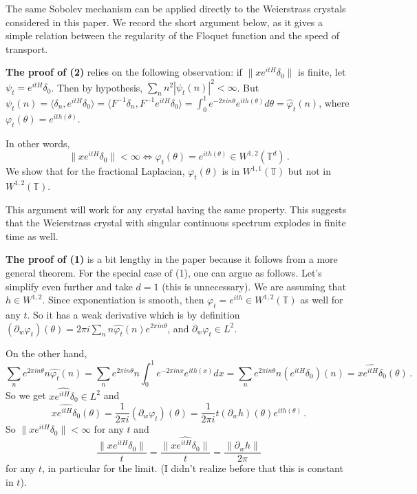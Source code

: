 \documentclass[11pt]{amsart}
\theoremstyle{plain}
\theoremstyle{definition}
\numberwithin{equation}{section}
\begin{document}
The same Sobolev mechanism can be applied directly to the Weierstrass crystals considered in this paper. We record the short argument below, as it gives a simple relation between the regularity of the Floquet function and the speed of transport.

\textbf{The proof of (2)} relies on the following observation: if $\|x e^{itH}\delta_0\|$ is finite, let $\psi_t = e^{itH}\delta_0$. Then by hypothesis, $\sum_n n^2 |\psi_t(n)|^2<\infty$. But $\psi_t(n) = \langle \delta_n, e^{itH}\delta_0\rangle = \langle F^{-1}\delta_n,F^{-1}e^{itH}\delta_0\rangle=\int_0^1 e^{-2\pi i n\theta} e^{ith(\theta)} d\theta=\widehat{\varphi}_t(n)$, where $\varphi_t(\theta)=e^{ith(\theta)}$.

In other words, 
\[
\|x e^{itH}\delta_0\|<\infty \iff \varphi_t(\theta)=e^{ith(\theta)}\in W^{1,2}(\mathbb{T}^d) \,.
\] 
We show that for the fractional Laplacian, $\varphi_t(\theta)$ is in $W^{1,1}(\mathbb{T})$ but not in $W^{1,2}(\mathbb{T})$.

This argument will work for any crystal having the same property. This suggests that the Weierstrass crystal with singular continuous spectrum explodes in finite time as well.

\textbf{The proof of (1)} is a bit lengthy in the paper because it follows from a more general theorem. For the special case of (1), one can argue as follows. Let's simplify even further and take $d=1$ (this is unnecessary). We are assuming that $h\in W^{1,2}$. Since exponentiation is smooth, then $\varphi_t=e^{ith}\in W^{1,2}(\mathbb{T})$ as well for any $t$. So it has a weak derivative which is by definition $(\partial_w \varphi_t)(\theta)=2\pi i \sum_n n\widehat{\varphi_t}(n)e^{2\pi i n\theta}$, and $\partial_w \varphi_t\in L^2$.

On the other hand, 
\[
\sum_n e^{2\pi i n\theta} n \widehat{\varphi_t}(n) = \sum_n e^{2\pi i n\theta} n \int_0^1 e^{-2\pi i nx}e^{ith(x)}dx = \sum_n e^{2\pi i n\theta} n (e^{itH}\delta_0)(n) = \widehat{xe^{it H}\delta_0}(\theta) \,.
\]
So we get $\widehat{xe^{itH}\delta_0}\in L^2$ and
\[
\widehat{xe^{itH}\delta_0}(\theta)= \frac{1}{2\pi i}(\partial_w\varphi_t)(\theta)=\frac{1}{2\pi i}t(\partial_w h)(\theta)e^{ith(\theta)} \,.
\]
So $\|xe^{itH}\delta_0\|<\infty$ for any $t$ and
\begin{equation}\label{e:conspeed}
\frac{\|xe^{itH}\delta_0\|}{t} = \frac{\|\widehat{xe^{itH}\delta_0}\|}{t} = \frac{\|\partial_w h\|}{2\pi}
\end{equation}
for any $t$, in particular for the limit. (I didn't realize before that this is constant in $t$).
\end{document}
